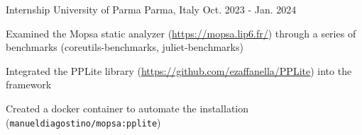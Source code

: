 

\begin{cventries}

  \cventry
    {Internship} %
    {University of Parma} %
    {Parma, Italy} %
    {Oct. 2023 - Jan. 2024} %
    {
      \begin{cvitems} %
				\item {Examined the Mopsa static analyzer (\url{https://mopsa.lip6.fr/}) through a series of benchmarks (coreutils-benchmarks, juliet-benchmarks)}
				\item {Integrated the PPLite library (\url{https://github.com/ezaffanella/PPLite}) into the framework}
				\item {Created a docker container to automate the installation (\texttt{manueldiagostino/mopsa:pplite})}
      \end{cvitems}
    }

\end{cventries}
